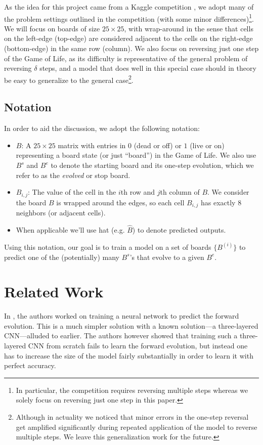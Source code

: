\documentclass[conference]{IEEEtran}
\begin{document}
As the idea for this project came from a Kaggle competition \cite{b1}, we adopt many of the problem settings outlined in the competition (with some minor differences)\footnote{In particular, the competition requires reversing multiple steps whereas we solely focus on reversing just one step in this paper.}. \label{wraparoundboard} We will focus on boards of size $25 \times 25$, with wrap-around in the sense that cells on the left-edge (top-edge) are considered adjacent to the cells on the right-edge (bottom-edge) in the same row (column). We also focus on reversing just one step of the Game of Life, as its difficulty is representative of the general problem of reversing $\delta$ steps, and a model that does well in this special case should in theory be easy to generalize to the general case\footnote{Although in actuality we noticed that minor errors in the one-step reversal get amplified significantly during repeated application of the model to reverse multiple steps. We leave this generalization work for the future.}.

\subsection{Notation}
In order to aid the discussion, we adopt the following notation:

\begin{itemize}
    \item $B$: A $25 \times 25$ matrix with entries in $0$ (dead or off) or $1$ (live or on) representing a board state (or just ``board'') in the Game of Life. We also use $B^{s}$ and $B^{e}$ to denote the starting board and its one-step evolution, which we refer to as the \emph{evolved} or stop board.
    \item $B_{i,j}$: The value of the cell in the $i$th row and $j$th column of $B$. We consider the board $B$ is wrapped around the edges, so each cell $B_{i, j}$ has exactly 8 neighbors (or adjacent cells). 
    \item When applicable we'll use hat (e.g. $\hat B$) to denote predicted outputs.
\end{itemize}

Using this notation, our goal is to train a model on a set of boards $\{B^{(i)}\}$ to predict one of the (potentially) many $B^{s}$'s that evolve to a given $B^{e}$.

\section{Related Work}
In \cite{b5}, the authors worked on training a neural network to predict the forward evolution. This is a much simpler solution with a known solution---a three-layered CNN---alluded to earlier. The authors however showed that training such a three-layered CNN from scratch fails to learn the forward evolution, but instead one has to increase the size of the model fairly substantially in order to learn it with perfect accuracy.
\end{document}
